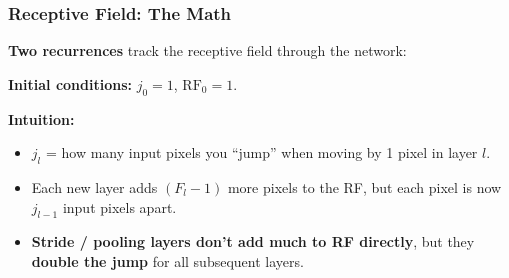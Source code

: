 \documentclass[notes,11pt, aspectratio=169]{beamer}
\begin{document}
\begin{frame}
\frametitle{Receptive Field: The Math}

\textbf{Two recurrences} track the receptive field through the network:

\vspace{6pt}

\vspace{6pt}
\textbf{Initial conditions:} $j_0 = 1$, \quad $\text{RF}_0 = 1$.

\vspace{6pt}
\textbf{Intuition:}
\begin{itemize}
    \item $j_l$ = how many input pixels you ``jump'' when moving by 1 pixel in layer $l$.
    \item Each new layer adds $(F_l - 1)$ more pixels to the RF, but each pixel is now $j_{l-1}$ input pixels apart.
    \item \textbf{Stride / pooling layers don't add much to RF directly}, but they \textbf{double the jump} for all subsequent layers.
\end{itemize}
\end{frame}
\end{document}
